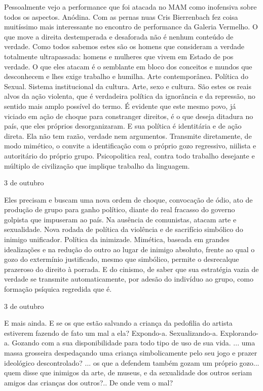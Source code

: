 Pessoalmente vejo a performance que foi atacada no MAM como inofensiva
sobre todos os aspectos. Anódina. Com as pernas nuas Cris Bierrenbach
fez coisa muitíssimo mais interessante no encontro de performance da
Galeria Vermelho. O que move a direita destemperada e desaforada não é
nenhum conteúdo de verdade. Como todos sabemos estes são os homens que
consideram a verdade totalmente ultrapassada: homens e mulheres que
vivem em Estado de pos verdade. O que eles atacam é o semblante em bloco
dos conceitos e mundos que desconhecem e lhes exige trabalho e humilha.
Arte contemporânea. Política do Sexual. Sistema institucional da
cultura. Arte, sexo e cultura. São estes os reais alvos da ação
violenta, que é verdadeira política da ignorância e da repressão, no
sentido mais amplo possível do termo. É evidente que este mesmo povo, já
viciado em ação de choque para constranger direitos, é o que deseja
ditadura no país, que eles próprios desorganizaram. E sua política é
identitária e de ação direta. Ela não tem razão, verdade nem argumentos.
Transmite diretamente, de modo mimético, o convite a identificação com o
próprio gozo regressivo, niilista e autoritário do próprio grupo.
Psicopolitica real, contra todo trabalho desejante e múltiplo de
civilização que implique trabalho da linguagem.

3 de outubro

Eles precisam e buscam uma nova ordem de choque, convocação de ódio, ato
de produção de grupo para ganho político, diante do real fracasso do
governo golpista que impuseram ao país. Na ausência de comunistas,
atacam arte e sexualidade. Nova rodada de política da violência e de
sacrifício simbólico do inimigo unificador. Política da inimizade.
Mimética, baseada em grandes idealizações e na redução do outro ao lugar
de inimigo absoluto, frente ao qual o gozo do extermínio justificado,
mesmo que simbólico, permite o desrecalque prazeroso do direito à
porrada. E do cinismo, de saber que sua estratégia vazia de verdade se
transmite automaticamente, por adesão do indivíduo ao grupo, como
formação psíquica regredida que é.

3 de outubro

E mais ainda. E se os que estão salvando a criança da pedofilia do
artista estiverem fazendo de fato um mal a ela? Expondo-a.
Sexualizando-a. Explorando-a. Gozando com a sua disponibilidade para
todo tipo de uso de sua vida. ... uma massa grosseira despedaçando uma
criança simbolicamente pelo seu jogo e prazer ideológico descontrolado?
... os que a defendem também gozam um próprio gozo... quem disse que
inimigos da arte, de museus, e da sexualidade dos outros seriam amigos
das crianças dos outros?.. De onde vem o mal?

